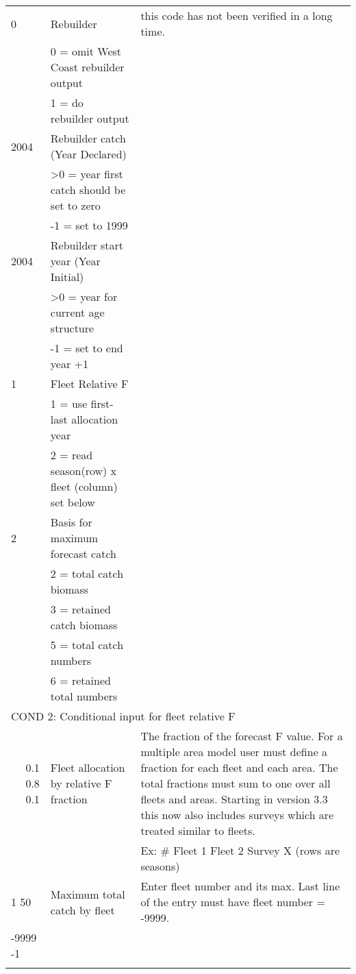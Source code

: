 \begin{landscape}
\begin{longtable}{p{3cm} p{7cm} p{11cm}}
 \hline
 0 & Rebuilder &\multirow{1}{1cm}[-0.1cm]{\parbox{11cm}{this code has not been verified in a long time.}} \\
   & 0 = omit West Coast rebuilder output & \\
   & 1 = do rebuilder output & \\
   
 \hline
 2004 & Rebuilder catch (Year Declared) & \\
      & >0 = year first catch should be set to zero & \\
      & -1 = set to 1999 & \\
      
 \hline
 2004 & Rebuilder start year (Year Initial) & \\
      & >0 = year for current age structure & \\
      & -1 = set to end year +1 & \\
 \hline
 1 & Fleet Relative F & \\
   & 1 = use first-last allocation year & \\
   & 2 = read season(row) x fleet (column) set below & \\
 \hline 
 2 & Basis for maximum forecast catch &  \\
   & 2 = total catch biomass & \\
   & 3 = retained catch biomass & \\
   & 5 = total catch numbers & \\
   & 6 = retained total numbers & \\
  \hline  
 \multicolumn{3}{l}{COND 2: Conditional input for fleet relative F} \\
 \multicolumn{1}{r}{0.1 0.8 0.1}  & Fleet allocation by relative F fraction & The fraction of the forecast F value.  For a multiple area model user must define a fraction for each fleet and each area.  The total fractions must sum to one over all fleets and areas.  Starting in version 3.3 this now also includes surveys which are treated similar to fleets.\\
   &  &  Ex: \# Fleet 1  Fleet 2  Survey X (rows are seasons)\\ 
 
  \hline
  1 50 & Maximum total catch by fleet & \multirow{1}{1cm}[-0.1cm]{\parbox{11cm}{Enter fleet number and its max. Last line of the entry must have fleet number = -9999.}} \\
  -9999 -1 & & \\
	   & & \\
  

\end{longtable}
\end{landscape}
